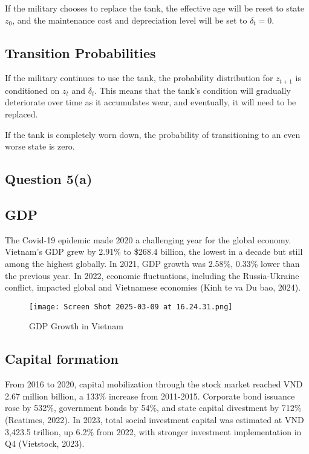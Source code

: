 \documentclass{article}
\begin{document}
If the military chooses to replace the tank, the effective age will be reset to state \( z_0 \), and the maintenance cost and depreciation level will be set to \( \delta_t = 0 \).

\subsection*{Transition Probabilities}

If the military continues to use the tank, the probability distribution for \( z_{t+1} \) is conditioned on \( z_t \) and \( \delta_t \). This means that the tank's condition will gradually deteriorate over time as it accumulates wear, and eventually, it will need to be replaced.

If the tank is completely worn down, the probability of transitioning to an even worse state is zero.


\subsection*{Question 5(a)}

\subsection*{GDP}
The Covid-19 epidemic made 2020 a challenging year for the global economy. Vietnam's GDP grew by 2.91\% to \$268.4 billion, the lowest in a decade but still among the highest globally. In 2021, GDP growth was 2.58\%, 0.33\% lower than the previous year. In 2022, economic fluctuations, including the Russia-Ukraine conflict, impacted global and Vietnamese economies (Kinh te va Du bao, 2024).

\begin{figure}[H]
    \centering
    \texttt{[image: Screen Shot 2025-03-09 at 16.24.31.png]}
    \caption{GDP Growth in Vietnam}
    \label{fig:gdp}
\end{figure}

\FloatBarrier %

\subsection*{Capital formation}
From 2016 to 2020, capital mobilization through the stock market reached VND 2.67 million billion, a 133\% increase from 2011-2015. Corporate bond issuance rose by 532\%, government bonds by 54\%, and state capital divestment by 712\% (Reatimes, 2022). In 2023, total social investment capital was estimated at VND 3,423.5 trillion, up 6.2\% from 2022, with stronger investment implementation in Q4 (Vietstock, 2023).
\end{document}
